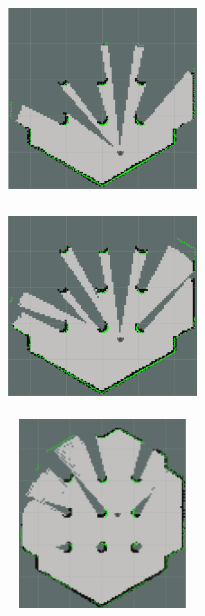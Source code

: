 {{	
		\begin{figure}[H]
			\captionsetup{width=.8\linewidth}
			\centering
			\begin{subfigure}[h]{.33\linewidth}
				\centering
				\includegraphics[scale=0.6, height =5cm, width=5cm]{Bilder/mapping_smpl_1.png}
				\label{pic:mapping_smpl_1}
			\end{subfigure}%
			\qquad %
			\begin{subfigure}[h]{.33\linewidth}
				\centering
				\includegraphics[scale=0.6, height =5cm, width=5cm]{Bilder/mapping_smpl_2.png}
				\label{pic:mapping_smpl_2}
			\end{subfigure}\hfill
			\begin{subfigure}[h]{.33\linewidth}
				\centering
				\includegraphics[scale=0.6, height =5cm, width=5cm]{Bilder/mapping_smpl_3.png}
				\label{pic:mapping_smpl_3}
			\end{subfigure}%

\end{figure}}}
